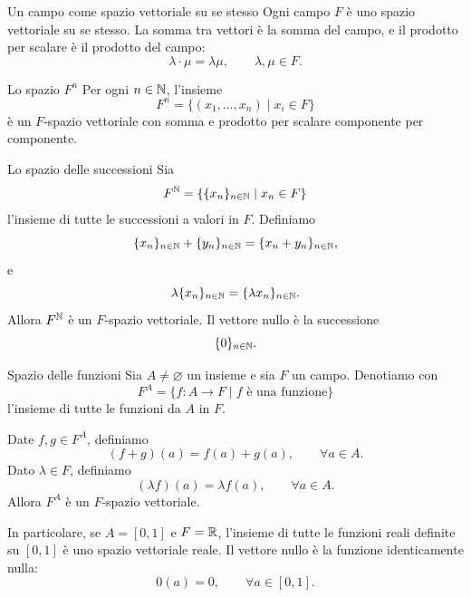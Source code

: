 \documentclass[a4paper]{article}
\begin{document}
\begin{snippetexample}{Un campo come spazio vettoriale su se stesso}
    Ogni campo \(F\) è uno spazio vettoriale su se stesso. La somma tra vettori è la somma del campo, e il prodotto per scalare è il prodotto del campo:
    \[
        \lambda\cdot \mu=\lambda\mu,
        \qquad
        \lambda,\mu\in F.
    \]
\end{snippetexample}

\begin{snippetexample}{Lo spazio \(F^n\)}
    Per ogni \(n\in\mathbb{N}\), l'insieme
    \[
        F^n=\{(x_1,\ldots,x_n)\mid x_i\in F\}
    \]
    è un \(F\)-spazio vettoriale con somma e prodotto per scalare componente per componente.
\end{snippetexample}

\begin{snippetexample}{Lo spazio delle successioni}
    Sia
    \[
        F^{\mathbb{N}}
        =
        \left\{
            \{x_n\}_{n\in\mathbb{N}}
            \mid
            x_n\in F
        \right\}
    \]
    l'insieme di tutte le successioni a valori in \(F\). Definiamo
    \[
        \{x_n\}_{n\in\mathbb{N}}
        +
        \{y_n\}_{n\in\mathbb{N}}
        =
        \{x_n+y_n\}_{n\in\mathbb{N}},
    \]
    e
    \[
        \lambda\{x_n\}_{n\in\mathbb{N}}
        =
        \{\lambda x_n\}_{n\in\mathbb{N}}.
    \]
    Allora \(F^{\mathbb{N}}\) è un \(F\)-spazio vettoriale. Il vettore nullo è la successione
    \[
        \{0\}_{n\in\mathbb{N}}.
    \]
\end{snippetexample}

\begin{snippetexample}{Spazio delle funzioni}
    Sia \(A\neq\varnothing\) un insieme e sia \(F\) un campo. Denotiamo con
    \[
        F^A=\{f:A\to F \mid f \text{ è una funzione}\}
    \]
    l'insieme di tutte le funzioni da \(A\) in \(F\).

    Date \(f,g\in F^A\), definiamo
    \[
        (f+g)(a)=f(a)+g(a),
        \qquad
        \forall a\in A.
    \]
    Dato \(\lambda\in F\), definiamo
    \[
        (\lambda f)(a)=\lambda f(a),
        \qquad
        \forall a\in A.
    \]
    Allora \(F^A\) è un \(F\)-spazio vettoriale.

    In particolare, se \(A=[0,1]\) e \(F=\mathbb{R}\), l'insieme di tutte le funzioni reali definite su \([0,1]\) è uno spazio vettoriale reale. Il vettore nullo è la funzione identicamente nulla:
    \[
        0(a)=0,
        \qquad
        \forall a\in[0,1].
    \]
\end{snippetexample}
\end{document}
